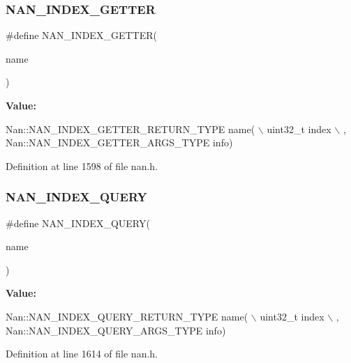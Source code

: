 \subsubsection{N\+A\+N\+\_\+\+I\+N\+D\+E\+X\+\_\+\+G\+E\+T\+T\+ER}
{\footnotesize\ttfamily \#define N\+A\+N\+\_\+\+I\+N\+D\+E\+X\+\_\+\+G\+E\+T\+T\+ER(\begin{DoxyParamCaption}\item[{}]{name }\end{DoxyParamCaption})}

{\bfseries Value\+:}
\begin{DoxyCode}
Nan::NAN_INDEX_GETTER_RETURN_TYPE name(                                    \(\backslash\)
        uint32\_t index                                                         \(\backslash\)
      , Nan::NAN_INDEX_GETTER_ARGS_TYPE info)
\end{DoxyCode}


Definition at line 1598 of file nan.\+h.

\mbox{\label{nan_8h_a58fe700e5d6b763c397b8b9f48d4dde4}} 
\subsubsection{N\+A\+N\+\_\+\+I\+N\+D\+E\+X\+\_\+\+Q\+U\+E\+RY}
{\footnotesize\ttfamily \#define N\+A\+N\+\_\+\+I\+N\+D\+E\+X\+\_\+\+Q\+U\+E\+RY(\begin{DoxyParamCaption}\item[{}]{name }\end{DoxyParamCaption})}

{\bfseries Value\+:}
\begin{DoxyCode}
Nan::NAN_INDEX_QUERY_RETURN_TYPE name(                                     \(\backslash\)
        uint32\_t index                                                         \(\backslash\)
      , Nan::NAN_INDEX_QUERY_ARGS_TYPE info)
\end{DoxyCode}


Definition at line 1614 of file nan.\+h.

\mbox{\label{nan_8h_ace34b5f859e79749c65cf7584bd7a8f2}} 
